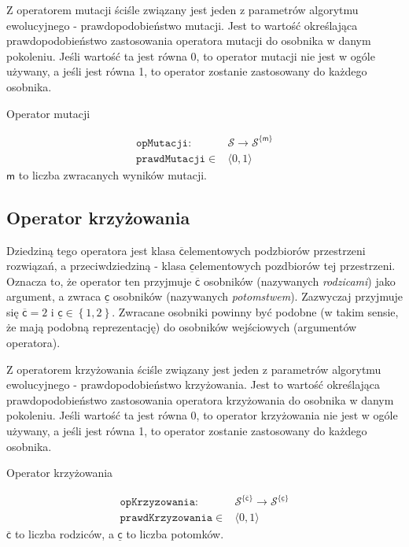 \documentclass[twoside]{iisthesis}
\newcommand{\important}[1]{\mathcal{#1}}
\newcommand{\param}[1]{\mathtt{#1}}
\newcommand{\variable}[1]{\mathsf{#1}}
\newcommand{\inputVar}[1]{\variable{\overline{#1}}}
\newcommand{\outputVar}[1]{\variable{\underline{#1}}}
\newcommand{\withSize}[2]{{#1}^{ \{ #2 \}}}
\newcommand{\range}[2]{\langle#1, #2\rangle}
\begin{document}
Z operatorem mutacji ściśle związany jest jeden z parametrów algorytmu ewolucyjnego - prawdopodobieństwo mutacji. Jest to wartość określająca prawdopodobieństwo zastosowania operatora mutacji do osobnika w danym pokoleniu. Jeśli wartość ta jest równa 0, to operator mutacji nie jest w ogóle używany, a jeśli jest równa 1, to operator zostanie zastosowany do każdego osobnika.

\begin{signature}
	\caption{Operator mutacji \label{signature:mutation}}
	\begin{align}
	\param{opMutacji}: & \important{S} \rightarrow \withSize{\important{S}}{\variable{m}} \\
	\param{prawdMutacji} \in & \range{0}{1}
	\end{align}
	$\variable{m}$ to liczba zwracanych wyników mutacji.
\end{signature}	

\subsection{Operator krzyżowania} \label{subsection:crossover}

Dziedziną tego operatora jest klasa $\inputVar{c}$elementowych podzbiorów przestrzeni rozwiązań, a przeciwdziedziną - klasa $\outputVar{c}$elementowych pozdbiorów tej przestrzeni. Oznacza to, że operator ten przyjmuje $\inputVar{c}$ osobników (nazywanych \emph{rodzicami}) jako argument, a zwraca $\outputVar{c}$ osobników (nazywanych \emph{potomstwem}). Zazwyczaj przyjmuje się $ \inputVar{c} = 2 $ i $\outputVar{c} \in \left\{1, 2 \right\}$. Zwracane osobniki powinny być podobne (w takim sensie, że mają podobną reprezentację) do osobników wejściowych (argumentów operatora). 

Z operatorem krzyżowania ściśle związany jest jeden z parametrów algorytmu ewolucyjnego - prawdopodobieństwo krzyżowania. Jest to wartość określająca prawdopodobieństwo zastosowania operatora krzyżowania do osobnika w danym pokoleniu. Jeśli wartość ta jest równa 0, to operator krzyżowania nie jest w ogóle używany, a jeśli jest równa 1, to operator zostanie zastosowany do każdego osobnika.

\begin{signature}
	\caption{Operator krzyżowania \label{signature:crossover}}
	\begin{align}
	\param{opKrzyzowania}: & \withSize{\important{S}}{\inputVar{c}} \rightarrow \withSize{\important{S}}{\outputVar{c}} \\
	\param{prawdKrzyzowania} \in & \range{0}{1}
	\end{align}
	$\inputVar{c}$ to liczba rodziców, a $\outputVar{c}$ to liczba potomków.
\end{signature}	
\end{document}
